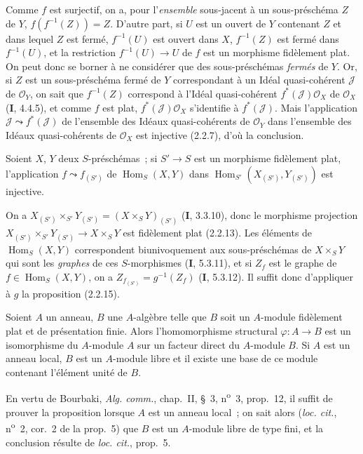 Comme $f$ est surjectif, on a, pour l'\emph{ensemble} sous-jacent à un
sous-préschéma $Z$ de $Y$, $f(f^{-1}(Z))=Z$. D'autre part, si $U$ est un
ouvert de $Y$ contenant $Z$ et dans lequel $Z$ est fermé, $f^{-1}(U)$ est
ouvert dans $X$, $f^{-1}(Z)$ est fermé dans $f^{-1}(U)$, et la restriction
$f^{-1}(U)\to U$ de $f$ est un morphisme fidèlement plat. On peut donc se
borner à ne considérer que des sous-préschémas \emph{fermés} de $Y$. Or, si
$Z$ est un sous-préschéma fermé de $Y$ correspondant à un Idéal
quasi-cohérent $\mathscr J$ de $\mathcal O_Y$, on sait que $f^{-1}(Z)$
correspond à l'Idéal quasi-cohérent $f^*(\mathscr J)\mathcal O_X$ de
$\mathcal O_X$ (\textbf{I}, 4.4.5), et comme $f$ est plat,
$f^*(\mathscr J)\mathcal O_X$ s'identifie à $f^*(\mathscr J)$. Mais
l'application $\mathscr J\leadsto f^*(\mathscr J)$ de l'ensemble des Idéaux
quasi-cohérents de $\mathcal O_Y$ dans l'ensemble des Idéaux quasi-cohérents
de $\mathcal O_X$ est injective (2.2.7), d'où la conclusion.

\begin{corollary}[2.2.16]
\label{IV.2.2.16-fr}
Soient $X$, $Y$ deux $S$-préschémas~; si $S'\to S$ est un morphisme
fidèlement plat, l'application $f\leadsto f_{(S')}$ de
$\operatorname{Hom}_S(X,Y)$ dans
$\operatorname{Hom}_{S'}(X_{(S')},Y_{(S')})$ est injective.
\end{corollary}

On a $X_{(S')}\times_{S'}Y_{(S')}=(X\times_S Y)_{(S')}$ (\textbf{I}, 3.3.10), donc le
morphisme projection
$X_{(S')}\times_{S'}Y_{(S')}\to X\times_S Y$ est fidèlement plat (2.2.13).
Les éléments de $\operatorname{Hom}_S(X,Y)$ correspondent biunivoquement aux
sous-préschémas de $X\times_S Y$ qui sont les \emph{graphes} de ces
$S$-morphismes (\textbf{I}, 5.3.11), et si $Z_f$ est le graphe de
$f\in\operatorname{Hom}_S(X,Y)$, on a $Z_{f_{(S')}}=g^{-1}(Z_f)$ (\textbf{I}, 5.3.12).
Il suffit donc d'appliquer à $g$ la proposition (2.2.15).

\begin{proposition}[2.2.17]
\label{IV.2.2.17-fr}
Soient $A$ un anneau, $B$ une $A$-algèbre telle que $B$ soit un $A$-module
fidèlement plat et de présentation finie. Alors l'homomorphisme structural
$\varphi:A\to B$ est un isomorphisme du $A$-module $A$ sur un facteur
direct du $A$-module $B$. Si $A$ est un anneau local, $B$ est un $A$-module
libre et il existe une base de ce module contenant l'élément unité de $B$.
\end{proposition}

En vertu de Bourbaki, \emph{Alg. comm.}, chap.~II, \S~3,
n\textsuperscript{o}~3, prop.~12, il suffit de prouver la proposition lorsque
$A$ est un anneau local~; on sait alors (\emph{loc. cit.},
n\textsuperscript{o}~2, cor.~2 de la prop.~5) que $B$ est un $A$-module libre
de type fini, et la conclusion résulte de \emph{loc. cit.}, prop.~5.

